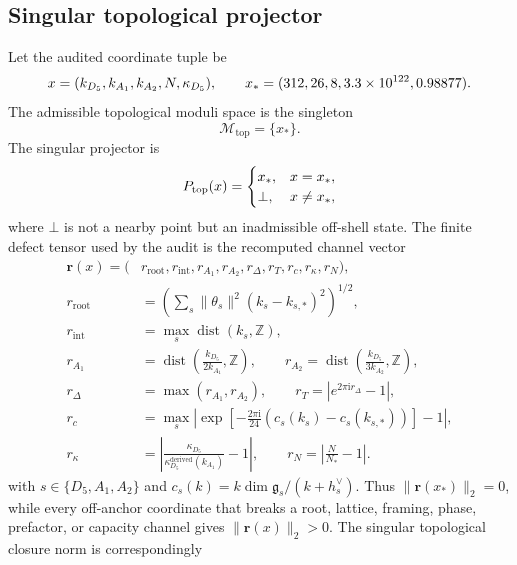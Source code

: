 \documentclass[11pt]{article}
\newcommand{\ii}{\mathrm{i}}
\begin{document}
\subsection{Singular topological projector}
Let the audited coordinate tuple be
\begin{equation}
  x=(k_{D_5},k_{A_1},k_{A_2},N,\kappa_{D_5}),
  \qquad
  x_*=(312,26,8,3.3\times10^{122},0.98877).
  \label{eq:anchor-point}
\end{equation}
The admissible topological moduli space is the singleton
\begin{equation}
  \mathcal{M}_{\mathrm{top}}=\{x_*\}.
  \label{eq:singleton-moduli}
\end{equation}
The singular projector is
\begin{equation}
  P_{\rm top}(x)=
  \begin{cases}
    x_*, & x=x_*,\\
    \bot, & x\neq x_*,
  \end{cases}
  \label{eq:ptop}
\end{equation}
where \(\bot\) is not a nearby point but an inadmissible off-shell state.  The finite defect tensor used by the audit is the recomputed channel vector
\begin{equation}
\begin{aligned}
  \mathbf{r}(x)=(&r_{\mathrm{root}},r_{\mathrm{int}},r_{A_1},r_{A_2},
    r_{\Delta},r_T,r_{c},r_{\kappa},r_N),\\
  r_{\mathrm{root}}&=\left(\sum_s\|\theta_s\|^2(k_s-k_{s,*})^2\right)^{1/2},\\
  r_{\mathrm{int}}&=\max_s\operatorname{dist}(k_s,\mathbb{Z}),\\
  r_{A_1}&=\operatorname{dist}\!\left(\frac{k_{D_5}}{2k_{A_1}},\mathbb{Z}\right),
    \qquad
  r_{A_2}=\operatorname{dist}\!\left(\frac{k_{D_5}}{3k_{A_2}},\mathbb{Z}\right),\\
  r_{\Delta}&=\max(r_{A_1},r_{A_2}),
    \qquad
  r_T=\left|e^{2\pi\ii r_{\Delta}}-1\right|,\\
  r_c&=\max_s\left|\exp\!\left[-\frac{2\pi\ii}{24}
    (c_s(k_s)-c_s(k_{s,*}))\right]-1\right|,\\
  r_{\kappa}&=\left|\frac{\kappa_{D_5}}{\kappa_{D_5}^{\mathrm{derived}}(k_{A_1})}-1\right|,
    \qquad
  r_N=\left|\frac{N}{N_*}-1\right|.
\end{aligned}
\label{eq:finite-defect-tensor}
\end{equation}
with \(s\in\{D_5,A_1,A_2\}\) and \(c_s(k)=k\dim\mathfrak{g}_s/(k+h_s^\vee)\).  Thus \(\|\mathbf{r}(x_*)\|_2=0\), while every off-anchor coordinate that breaks a root, lattice, framing, phase, prefactor, or capacity channel gives \(\|\mathbf{r}(x)\|_2>0\).  The singular topological closure norm is correspondingly
\end{document}
